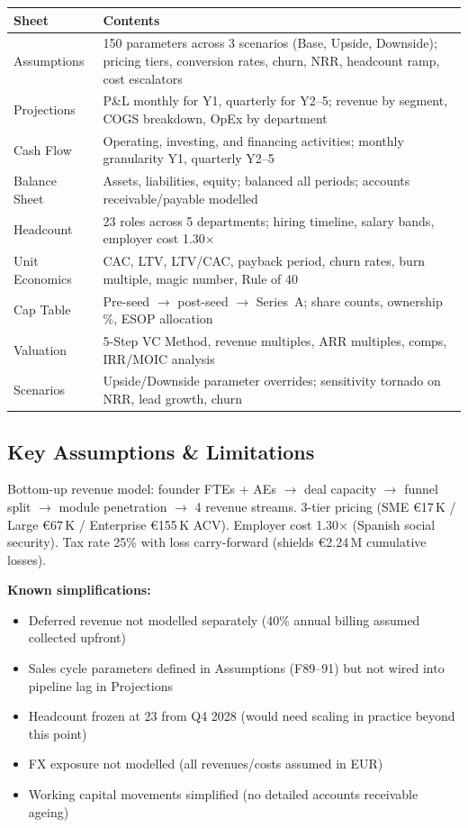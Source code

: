 \documentclass[11pt,a4paper]{article}
\begin{document}
\begin{tabularx}{\textwidth}{lX}
\toprule
\textbf{Sheet} & \textbf{Contents} \\
\midrule
Assumptions & 150 parameters across 3 scenarios (Base, Upside, Downside); pricing tiers, conversion rates, churn, NRR, headcount ramp, cost escalators \\
Projections & P\&L monthly for Y1, quarterly for Y2--5; revenue by segment, COGS breakdown, OpEx by department \\
Cash Flow & Operating, investing, and financing activities; monthly granularity Y1, quarterly Y2--5 \\
Balance Sheet & Assets, liabilities, equity; balanced all periods; accounts receivable/payable modelled \\
Headcount & 23 roles across 5 departments; hiring timeline, salary bands, employer cost 1.30$\times$ \\
Unit Economics & CAC, LTV, LTV/CAC, payback period, churn rates, burn multiple, magic number, Rule of 40 \\
Cap Table & Pre-seed $\rightarrow$ post-seed $\rightarrow$ Series~A; share counts, ownership \%, ESOP allocation \\
Valuation & 5-Step VC Method, revenue multiples, ARR multiples, comps, IRR/MOIC analysis \\
Scenarios & Upside/Downside parameter overrides; sensitivity tornado on NRR, lead growth, churn \\
\bottomrule
\end{tabularx}

\subsection*{Key Assumptions \& Limitations}

Bottom-up revenue model: founder FTEs + AEs $\rightarrow$ deal capacity $\rightarrow$ funnel split $\rightarrow$ module penetration $\rightarrow$ 4 revenue streams. 3-tier pricing (SME \euro{}17\,K / Large \euro{}67\,K / Enterprise \euro{}155\,K ACV). Employer cost 1.30$\times$ (Spanish social security). Tax rate 25\% with loss carry-forward (shields \euro{}2.24\,M cumulative losses).

\textbf{Known simplifications:}
\begin{itemize}
\item Deferred revenue not modelled separately (40\% annual billing assumed collected upfront)
\item Sales cycle parameters defined in Assumptions (F89--91) but not wired into pipeline lag in Projections
\item Headcount frozen at 23 from Q4 2028 (would need scaling in practice beyond this point)
\item FX exposure not modelled (all revenues/costs assumed in EUR)
\item Working capital movements simplified (no detailed accounts receivable ageing)
\end{itemize}
\end{document}
